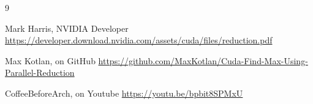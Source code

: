 \documentclass[10pt,journal,compsoc]{IEEEtran}
\begin{document}
\begin{thebibliography}{9}

Mark Harris, NVIDIA Developer
\url{https://developer.download.nvidia.com/assets/cuda/files/reduction.pdf}

Max Kotlan, on GitHub
\url{https://github.com/MaxKotlan/Cuda-Find-Max-Using-Parallel-Reduction}

CoffeeBeforeArch, on Youtube
\url{https://youtu.be/bpbit8SPMxU}

\end{thebibliography}




\end{document}
